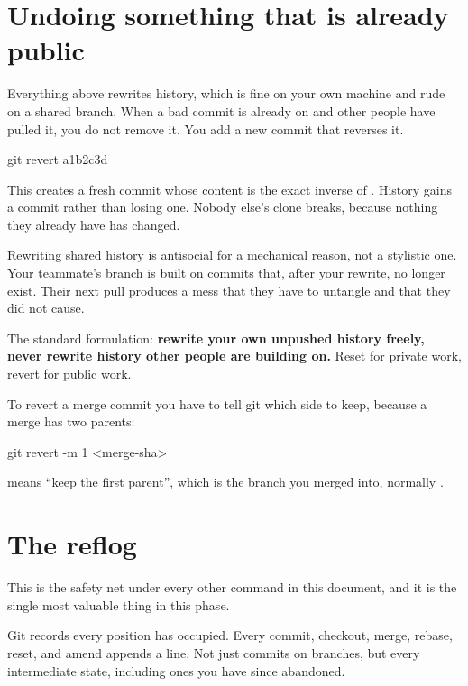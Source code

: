 \documentclass[11pt]{article}
\begin{document}
\section{Undoing something that is already public}

Everything above rewrites history, which is fine on your own machine and rude on a
shared branch. When a bad commit is already on  and other people have
pulled it, you do not remove it. You add a new commit that reverses it.

\begin{shell}
git revert a1b2c3d
\end{shell}

This creates a fresh commit whose content is the exact inverse of .
History gains a commit rather than losing one. Nobody else's clone breaks, because
nothing they already have has changed.

\begin{why}
Rewriting shared history is antisocial for a mechanical reason, not a stylistic one.
Your teammate's branch is built on commits that, after your rewrite, no longer
exist. Their next pull produces a mess that they have to untangle and that they did
not cause.

The standard formulation: \textbf{rewrite your own unpushed history freely, never
rewrite history other people are building on.} Reset for private work, revert for
public work.
\end{why}

To revert a merge commit you have to tell git which side to keep, because a merge
has two parents:

\begin{shell}
git revert -m 1 <merge-sha>
\end{shell}

 means ``keep the first parent'', which is the branch you merged into,
normally .

\section{The reflog}

This is the safety net under every other command in this document, and it is the
single most valuable thing in this phase.

Git records every position  has occupied. Every commit, checkout, merge,
rebase, reset, and amend appends a line. Not just commits on branches, but every
intermediate state, including ones you have since abandoned.
\end{document}
